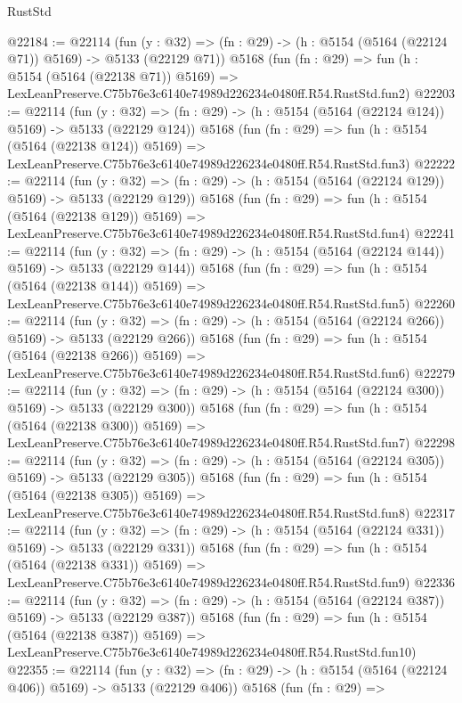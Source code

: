 \begin{lexlean}{RustStd}
\begin{coremodule}
@22184 := @22114
    (fun (y : @32) => (fn : @29) -> (h : @5154 (@5164 (@22124 @71)) @5169) -> @5133 (@22129 @71))
    @5168
    (fun (fn : @29) =>
    fun (h : @5154 (@5164 (@22138 @71)) @5169) =>
    LexLeanPreserve.C75b76e3c6140e74989d226234e0480ff.R54.RustStd.fun2)
@22203 := @22114
    (fun (y : @32) => (fn : @29) -> (h : @5154 (@5164 (@22124 @124)) @5169) -> @5133 (@22129 @124))
    @5168
    (fun (fn : @29) =>
    fun (h : @5154 (@5164 (@22138 @124)) @5169) =>
    LexLeanPreserve.C75b76e3c6140e74989d226234e0480ff.R54.RustStd.fun3)
@22222 := @22114
    (fun (y : @32) => (fn : @29) -> (h : @5154 (@5164 (@22124 @129)) @5169) -> @5133 (@22129 @129))
    @5168
    (fun (fn : @29) =>
    fun (h : @5154 (@5164 (@22138 @129)) @5169) =>
    LexLeanPreserve.C75b76e3c6140e74989d226234e0480ff.R54.RustStd.fun4)
@22241 := @22114
    (fun (y : @32) => (fn : @29) -> (h : @5154 (@5164 (@22124 @144)) @5169) -> @5133 (@22129 @144))
    @5168
    (fun (fn : @29) =>
    fun (h : @5154 (@5164 (@22138 @144)) @5169) =>
    LexLeanPreserve.C75b76e3c6140e74989d226234e0480ff.R54.RustStd.fun5)
@22260 := @22114
    (fun (y : @32) => (fn : @29) -> (h : @5154 (@5164 (@22124 @266)) @5169) -> @5133 (@22129 @266))
    @5168
    (fun (fn : @29) =>
    fun (h : @5154 (@5164 (@22138 @266)) @5169) =>
    LexLeanPreserve.C75b76e3c6140e74989d226234e0480ff.R54.RustStd.fun6)
@22279 := @22114
    (fun (y : @32) => (fn : @29) -> (h : @5154 (@5164 (@22124 @300)) @5169) -> @5133 (@22129 @300))
    @5168
    (fun (fn : @29) =>
    fun (h : @5154 (@5164 (@22138 @300)) @5169) =>
    LexLeanPreserve.C75b76e3c6140e74989d226234e0480ff.R54.RustStd.fun7)
@22298 := @22114
    (fun (y : @32) => (fn : @29) -> (h : @5154 (@5164 (@22124 @305)) @5169) -> @5133 (@22129 @305))
    @5168
    (fun (fn : @29) =>
    fun (h : @5154 (@5164 (@22138 @305)) @5169) =>
    LexLeanPreserve.C75b76e3c6140e74989d226234e0480ff.R54.RustStd.fun8)
@22317 := @22114
    (fun (y : @32) => (fn : @29) -> (h : @5154 (@5164 (@22124 @331)) @5169) -> @5133 (@22129 @331))
    @5168
    (fun (fn : @29) =>
    fun (h : @5154 (@5164 (@22138 @331)) @5169) =>
    LexLeanPreserve.C75b76e3c6140e74989d226234e0480ff.R54.RustStd.fun9)
@22336 := @22114
    (fun (y : @32) => (fn : @29) -> (h : @5154 (@5164 (@22124 @387)) @5169) -> @5133 (@22129 @387))
    @5168
    (fun (fn : @29) =>
    fun (h : @5154 (@5164 (@22138 @387)) @5169) =>
    LexLeanPreserve.C75b76e3c6140e74989d226234e0480ff.R54.RustStd.fun10)
@22355 := @22114
    (fun (y : @32) => (fn : @29) -> (h : @5154 (@5164 (@22124 @406)) @5169) -> @5133 (@22129 @406))
    @5168
    (fun (fn : @29) =>

\end{coremodule}
\end{lexlean}
